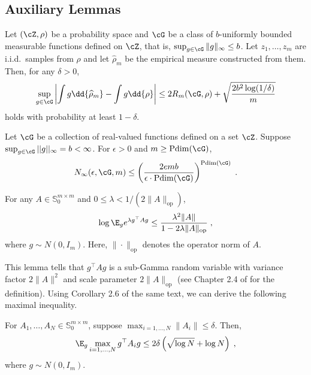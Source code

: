 \documentclass[11pt]{article}
\begin{document}
\subsection{Auxiliary Lemmas}
\begin{lemma}
	\label{lem:bound}
	Let $(\cZ, \rho)$ be a probability space and $\cG$ be a class of $b$-uniformly bounded measurable functions defined on $\cZ$, that is, $\sup_{g \in \cG} \|g\|_\infty \le b$. Let $z_1, \ldots, z_m$ are i.i.d.\ samples from $\rho$ and let $\widehat{\rho}_m$ be the empirical measure constructed from them. Then, for any $\delta > 0$,
	\begin{equation*}
		\sup_{g \in \cG} \left|\int g \dd{\widehat{\rho}_m} - \int g \dd{\rho} \right| \le 2 R_m(\cG, \rho) + \sqrt{\frac{2 b^2 \log(1 / \delta)}{m}}
	\end{equation*}
	holds with probability at least $1 - \delta$.
\end{lemma}

\begin{lemma}
	\label{lem:uniform_covering_to_pdim}
	Let $\cG$ be a collection of real-valued functions defined on a set $\cZ$. Suppose $\sup_{g \in \cG} ||g||_\infty = b < \infty$. For $\epsilon > 0$ and $m \ge \mathrm{Pdim}(\cG)$,  
	\begin{equation*}
		N_\infty(\epsilon, \cG, m) \le \left( \frac{2 e m b}{\epsilon \cdot {\rm Pdim}(\cG)} \right)^{{\rm Pdim}(\cG)} \;.
	\end{equation*}
\end{lemma}


\begin{lemma}
	 For any $A \in \mathbb{S}_0^{m \times m}$ and $0 \leq \lambda < 1/(2\|A\|_{\mathrm{op}})$,
	\begin{align}
		\log \E_g e^{\lambda g^\top A g} \leq \frac{\lambda^2 \|A \|}{1- 2\lambda \| A \|_{\mathrm{op}}} \;,
	\end{align}
	where $g \sim N(0, I_m)$. Here, $\| \cdot \|_{\mathrm{op}}$ denotes the operator norm of $A$.
\end{lemma}
This lemma tells that $g^\top A g$ is a sub-Gamma random variable with variance factor $2 \|A\|^2$ and scale parameter $2 \|A\|_{\mathrm{op}}$ (see Chapter 2.4 of \cite{boucheron_lugosi_massart_2013} for the definition). Using Corollary 2.6 of the same text, we can derive the following maximal inequality.
\begin{lemma}
	\label{lem:maximal-ineq}
	For $A_1, \ldots, A_N \in \mathbb{S}_0^{m \times m}$, suppose $\max_{i = 1, \ldots, N} \| A_i \| \leq \delta$. Then,
	\begin{align}
		\E_{g} \max_{i = 1, \ldots, N} g^\top A_i g \leq 2 \delta \left( \sqrt{\log N} + \log N \right) \;,
	\end{align}
	where $g \sim N(0, I_m)$.
\end{lemma}
\end{document}
